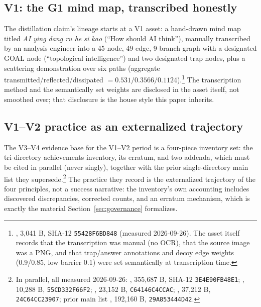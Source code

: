 \documentclass[11pt]{article}
\newcommand{\sha}[1]{\texttt{#1}}
\begin{document}
\subsection{V1: the G1 mind map, transcribed honestly}

The distillation claim's lineage starts at a V1 asset: a hand-drawn mind map titled \emph{AI ying dang ru he si kao} (``How should AI think''), manually transcribed by an analysis engineer into a 45-node, 49-edge, 9-branch graph with a designated GOAL node (``topological intelligence'') and two designated trap nodes, plus a scattering demonstration over six paths (aggregate transmitted/reflected/dissipated $= 0.531 / 0.3566 / 0.1124$).\footnote{, 3{,}041 B, SHA-12 \sha{55428F6BD848} (measured 2026-09-26). The asset itself records that the transcription was manual (no OCR), that the source image was a PNG, and that trap/answer annotations and decoy edge weights (0.9/0.85, low barrier 0.1) were set semantically at transcription time.} The transcription method and the semantically set weights are disclosed in the asset itself, not smoothed over; that disclosure is the house style this paper inherits.

\subsection{V1--V2 practice as an externalized trajectory}

The V3--V4 evidence base for the V1--V2 period is a four-piece inventory set: the tri-directory achievements inventory, its erratum, and two addenda, which must be cited in parallel (never singly), together with the prior single-directory main list they supersede.\footnote{In parallel, all measured 2026-09-26: , 355{,}687 B, SHA-12 \sha{3E4E90FB48E1}; , 10{,}288 B, \sha{55CD332F66F2}; , 23{,}152 B, \sha{C64146C4CCAC}; , 37{,}212 B, \sha{24C64CC23907}; prior main list , 192{,}160 B, \sha{29A853444D42}.} The practice they record is the externalized trajectory of the four principles, not a success narrative: the inventory's own accounting includes discovered discrepancies, corrected counts, and an erratum mechanism, which is exactly the material Section~\ref{sec:governance} formalizes.
\end{document}
